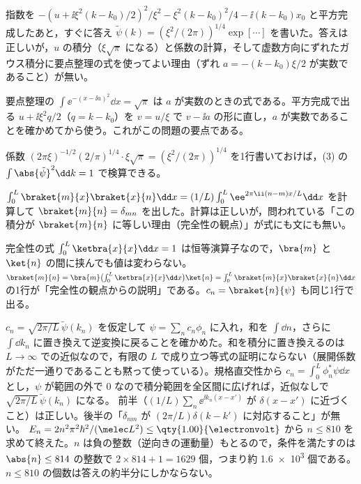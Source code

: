 \begin{kotaeran}
   指数を $-(u+\ii\xi^{2}(k-k_{0})/2)^{2}/\xi^{2}-\xi^{2}(k-k_{0})^{2}/4-\ii(k-k_{0})x_{0}$ と平方完成したあと，すぐに答え $\tilde{\psi}(k)=(\xi^{2}/(2\pi))^{1/4}\exp[\cdots]$ を書いた。答えは正しいが，$u$ の積分（$\xi\sqrt{\pi}$ になる）と係数の計算，そして虚数方向にずれたガウス積分に要点整理の式を使ってよい理由（ずれ $a=-(k-k_{0})\xi/2$ が実数であること）が無い。
\end{kotaeran}
\begin{rikai}
  \item 要点整理の $\int\ee^{-(x-\ii a)^{2}}\dd x=\sqrt{\pi}$ は $a$ が実数のときの式である。平方完成で出る $u+\ii\xi^{2}q/2$（$q=k-k_{0}$）を $v=u/\xi$ で $v-\ii a$ の形に直し，$a$ が実数であることを確かめてから使う。これがこの問題の要点である。
  \item 係数 $(2\pi\xi)^{-1/2}(2/\pi)^{1/4}\cdot\xi\sqrt{\pi}=(\xi^{2}/(2\pi))^{1/4}$ を1行書いておけば，(3) の $\int\abs{\tilde{\psi}}^{2}\dd k=1$ で検算できる。
\end{rikai}
\begin{kotaeran}
   $\int_{0}^{L}\braket{m}{x}\braket{x}{n}\dd x=(1/L)\int_{0}^{L}\ee^{2\pi\ii(n-m)x/L}\dd x$ を計算して $\braket{m}{n}=\delta_{mn}$ を出した。計算は正しいが，問われている「この積分が $\braket{m}{n}$ に等しい理由（完全性の観点）」が式にも文にも無い。
\end{kotaeran}
\begin{rikai}
  \item 完全性の式 $\int_{0}^{L}\ketbra{x}{x}\dd x=1$ は恒等演算子なので，$\bra{m}$ と $\ket{n}$ の間に挟んでも値は変わらない。$\braket{m}{n}=\bra{m}\bigl(\int_{0}^{L}\ketbra{x}{x}\dd x\bigr)\ket{n}=\int_{0}^{L}\braket{m}{x}\braket{x}{n}\dd x$ の1行が「完全性の観点からの説明」である。$c_{n}=\braket{n}{\psi}$ も同じ1行で出る。
\end{rikai}
\begin{kotaeran}
   $c_{n}=\sqrt{2\pi/L}\,\tilde{\psi}(k_{n})$ を仮定して $\psi=\sum_{n}c_{n}\phi_{n}$ に入れ，和を $\int\dd n$，さらに $\int\dd k_{n}$ に置き換えて逆変換に戻ることを確かめた。和を積分に置き換えるのは $L\to\infty$ での近似なので，有限の $L$ で成り立つ等式の証明にならない（展開係数がただ一通りであることも黙って使っている）。規格直交性から $c_{n}=\int_{0}^{L}\phi_{n}^{*}\psi\dd x$ とし，$\psi$ が範囲の外で $0$ なので積分範囲を全区間に広げれば，近似なしで $\sqrt{2\pi/L}\,\tilde{\psi}(k_{n})$ になる。
   前半（$(1/L)\sum_{n}\ee^{\ii k_{n}(x-x')}$ が $\delta(x-x')$ に近づくこと）は正しい。後半の「$\delta_{nm}$ が $(2\pi/L)\delta(k-k')$ に対応すること」が無い。
   $E_{n}=2n^{2}\pi^{2}\hbar^{2}/(\melec L^{2})\le\qty{1.00}{\electronvolt}$ から $n\le810$ を求めて終えた。$n$ は負の整数（逆向きの運動量）もとるので，条件を満たすのは $\abs{n}\le814$ の整数で $2\times814+1=1629$ 個，つまり約 \num{1.6e3} 個である。$n\le810$ の個数は答えの約半分にしかならない。
\end{kotaeran}
